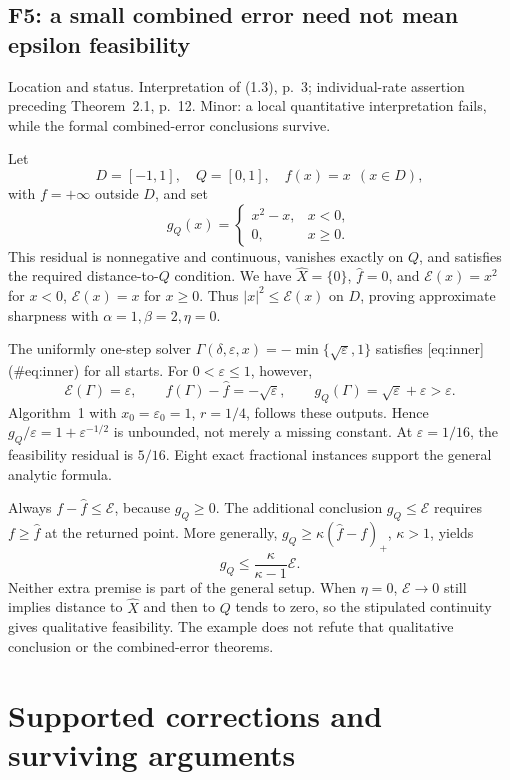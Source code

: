 \documentclass[10pt]{article}
\begin{document}
\subsection*{F5: a small combined error need not mean epsilon feasibility}
Location and status. Interpretation of (1.3), p. 3; individual-rate assertion preceding Theorem 2.1, p. 12. Minor: a local quantitative interpretation fails, while the formal combined-error conclusions survive.\par
Let \[D=[-1,1],\quad Q=[0,1],\quad f(x)=x\ \ (x\in D),\] with \(f=+\infty\) outside \(D\), and set \[g_Q(x)=
 \begin{cases}x^2-x,&x<0,\\0,&x\ge0.\end{cases}\] This residual is nonnegative and continuous, vanishes exactly on \(Q\), and satisfies the required distance-to-\(Q\) condition. We have \(\widehat X=\{0\}\), \(\widehat f=0\), and \(\mathcal E(x)=x^2\) for \(x<0\), \(\mathcal E(x)=x\) for \(x\ge0\). Thus \(|x|^2\le\mathcal E(x)\) on \(D\), proving approximate sharpness with \(\alpha=1,\beta=2,\eta=0\).\par
The uniformly one-step solver \(\Gamma(\delta,\varepsilon,x)=-\min\{\sqrt\varepsilon,1\}\) satisfies [eq:inner] (\#eq:inner) for all starts. For \(0<\varepsilon\le1\), however, \[\mathcal E(\Gamma)=\varepsilon,\qquad
 f(\Gamma)-\widehat f=-\sqrt\varepsilon,\qquad
 g_Q(\Gamma)=\sqrt\varepsilon+\varepsilon>\varepsilon .\] Algorithm 1 with \(x_0=\varepsilon_0=1\), \(r=1/4\), follows these outputs. Hence \(g_Q/\varepsilon=1+\varepsilon^{-1/2}\) is unbounded, not merely a missing constant. At \(\varepsilon=1/16\), the feasibility residual is \(5/16\). Eight exact fractional instances support the general analytic formula.\par
Always \(f-\widehat f\le\mathcal E\), because \(g_Q\ge0\). The additional conclusion \(g_Q\le\mathcal E\) requires \(f\ge\widehat f\) at the returned point. More generally, \(g_Q\ge\kappa(\widehat f-f)_+\), \(\kappa>1\), yields \[g_Q\le\frac{\kappa}{\kappa-1}\mathcal E.\] Neither extra premise is part of the general setup. When \(\eta=0\), \(\mathcal E\to0\) still implies distance to \(\widehat X\) and then to \(Q\) tends to zero, so the stipulated continuity gives qualitative feasibility. The example does not refute that qualitative conclusion or the combined-error theorems.\par
\section*{Supported corrections and surviving arguments}
\end{document}
